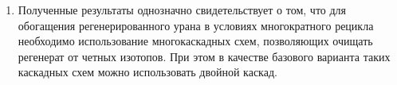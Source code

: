 \begin{enumerate}
  \item Полученные результаты однозначно свидетельствует о том, что для обогащения регенерированного урана в условиях многократного рецикла необходимо использование многокаскадных схем, позволяющих очищать регенерат от четных изотопов. При этом в качестве базового варианта таких каскадных схем можно использовать двойной каскад.
\end{enumerate}

\clearpage
